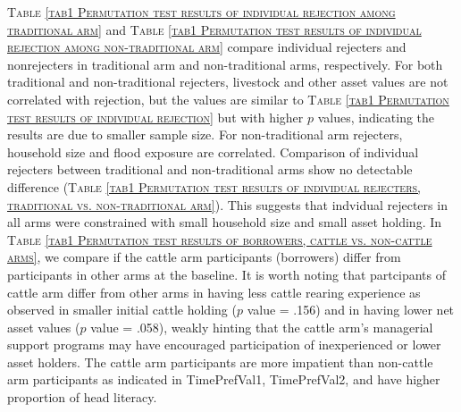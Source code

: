 	\textsc{\normalsize Table \ref{tab1 Permutation test results of individual rejection among traditional arm}} and \textsc{\normalsize Table \ref{tab1 Permutation test results of individual rejection among non-traditional arm}} compare individual rejecters and nonrejecters in \textsf{traditional} arm and non-\textsf{traditional} arms, respectively. For both \textsf{traditional} and non-\textsf{traditional} rejecters, livestock and other asset values are not correlated with rejection, but the values are similar to \textsc{\normalsize Table \ref{tab1 Permutation test results of individual rejection}} but with higher $p$ values, indicating the results are due to smaller sample size. For non-\textsf{traditional} arm rejecters, household size and flood exposure are correlated. Comparison of individual rejecters between \textsf{traditional} and non-\textsf{traditional} arms show no detectable difference (\textsc{\normalsize Table \ref{tab1 Permutation test results of individual rejecters, traditional vs. non-traditional arm}}). This suggests that indvidual rejecters in all arms were constrained with small household size and small asset holding. In \textsc{\normalsize Table \ref{tab1 Permutation test results of borrowers, cattle vs. non-cattle arms}}, we compare if the \textsf{cattle} arm participants (borrowers) differ from participants in other arms at the baseline. It is worth noting that partcipants of \textsf{cattle} arm differ from other arms in having less cattle rearing experience as observed in smaller initial cattle holding ($p$ value = .156) and in having lower net asset values ($p$ value = .058), weakly hinting that the \textsf{cattle} arm's managerial support programs may have encouraged participation of inexperienced or lower asset holders. The \textsf{cattle} arm participants are more impatient than non-\textsf{cattle} arm participants as indicated in \textsf{TimePrefVal1, TimePrefVal2}, and have higher proportion of head literacy. \label{RejectionLastPage}




